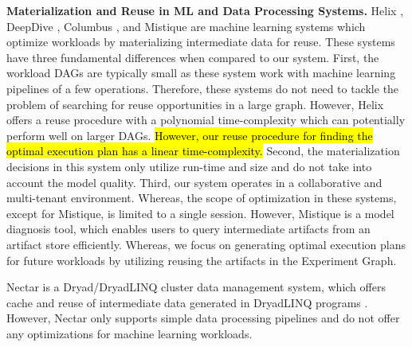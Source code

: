 \textbf{Materialization and Reuse in ML and Data Processing Systems.}
Helix \cite{xin2018h, xin2018helix}, DeepDive \cite{zhang2015deepdive}, Columbus \cite{zhang2016materialization}, and Mistique \cite{vartak2018mistique} are machine learning  systems which optimize workloads by materializing intermediate data for reuse.
These systems have three fundamental differences when compared to our system.
First, the workload DAGs are typically small as these system work with machine learning pipelines of a few operations.
Therefore, these systems do not need to tackle the problem of searching for reuse opportunities in a large graph.
However, Helix offers a reuse procedure with a polynomial time-complexity which can potentially perform well on larger DAGs.
\hl{However, our reuse procedure for finding the optimal execution plan has a linear time-complexity.}
Second, the materialization decisions in this system only utilize run-time and size and do not take into account the model quality.
Third, our system operates in a collaborative and multi-tenant environment.
Whereas, the scope of optimization in these systems, except for Mistique, is limited to a single session.
However, Mistique is a model diagnosis tool, which enables users to query intermediate artifacts from an artifact store efficiently.
Whereas, we focus on generating optimal execution plans for future workloads by utilizing reusing the artifacts in the Experiment Graph.

Nectar \cite{gunda2010nectar} is a  Dryad/DryadLINQ cluster data management system, which offers cache and reuse of intermediate data generated in DryadLINQ programs \cite{fetterly2009dryadlinq}.
However, Nectar only supports simple data processing pipelines and do not offer any optimizations for machine learning workloads.


